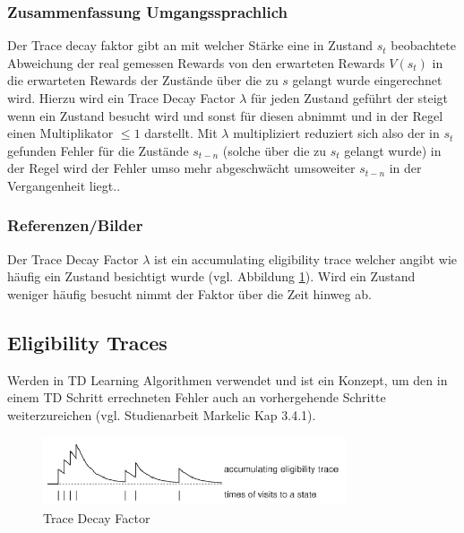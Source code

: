 \documentclass[10pt]{scrartcl}
\begin{document}
\subsubsection{Zusammenfassung Umgangssprachlich}
Der Trace decay faktor gibt an mit welcher Stärke eine in Zustand $s_t$ beobachtete Abweichung der real gemessen Rewards von den erwarteten Rewards $V(s_t)$ in die erwarteten Rewards der Zustände über die zu $s$ gelangt wurde eingerechnet wird.
Hierzu wird ein Trace Decay Factor $\lambda$ für jeden Zustand geführt der steigt wenn ein Zustand besucht wird und sonst für diesen abnimmt und in der Regel einen Multiplikator $\leq 1$ darstellt. Mit $\lambda$ multipliziert reduziert sich also der in $s_t$ gefunden Fehler für die Zustände $s_{t-n}$ (solche über die zu $s_t$ gelangt wurde) in der Regel wird der Fehler umso mehr abgeschwächt umsoweiter $s_{t-n}$ in der Vergangenheit liegt..

\subsubsection{Referenzen/Bilder}
Der Trace Decay Factor $\lambda$ ist ein \glqq accumulating eligibility trace\grqq\xspace welcher angibt wie häufig ein Zustand besichtigt wurde (vgl. Abbildung \ref{fig:Trace}). Wird ein Zustand weniger häufig besucht nimmt der Faktor über die Zeit hinweg ab.\\
\subsection{Eligibility Traces}
Werden in TD Learning Algorithmen verwendet und ist ein Konzept, um den in einem TD
Schritt errechneten Fehler auch an vorhergehende Schritte weiterzureichen (vgl. Studienarbeit
Markelic Kap 3.4.1).

\begin{figure}[htbp]
	\centering	\includegraphics[width=0.8\textwidth]{Bilder/TraceDecay.png}
	\caption{Trace Decay Factor}
	\label{fig:Trace}
\end{figure}

\listoftodos
\end{document}
